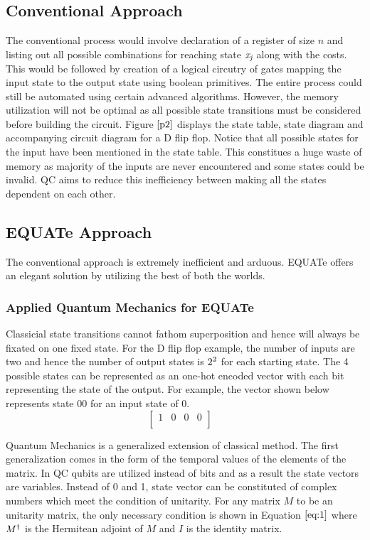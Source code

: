 \documentclass[conference]{IEEEtran}
\begin{document}
\subsection{Conventional Approach}
The conventional process would involve declaration of a register of size $\textit{n}$ and listing out all possible combinations for reaching state $\textit{x\textsubscript{j}}$ along with the costs. This would be followed by creation of a logical circutry of gates mapping the input state to the output state using boolean primitives. The entire process could still be automated using certain advanced algorithms. However, the memory utilization will not be optimal as all possible state transitions must be considered before building the circuit. Figure $\ref{p2}$ displays the state table, state diagram and accompanying circuit diagram for a D flip flop. Notice that all possible states for the input have been mentioned in the state table. This constitues a huge waste of memory as majority of the inputs are never encountered and some states could be invalid. QC aims to reduce this inefficiency between making all the states dependent on each other.

\subsection{EQUATe Approach}

The conventional approach is extremely inefficient and arduous. EQUATe offers an elegant solution by utilizing the best of both the worlds. 

\subsubsection{Applied Quantum Mechanics for EQUATe}
Classicial state transitions cannot fathom superposition and hence will always be fixated on one fixed state. For the D flip flop example, the number of inputs are two and hence the number of output states is $2\textsuperscript{2}$ for each starting state. The 4 possible states can be represented as an one-hot encoded vector with each bit representing the state of the output. For example, the vector shown below represents state 00 for an input state of 0.
$$
\begin{bmatrix} 
1&0&0&0\\
\end{bmatrix}
\quad
$$

Quantum Mechanics is a generalized extension of classical method. The first generalization comes in the form of the temporal values of the elements of the matrix. In QC qubits are utilized instead of bits and as a result the state vectors are variables. Instead of 0 and 1, state vector can be constituted of complex numbers which meet the condition of unitarity. For any matrix $\textit{M}$ to be an unitarity matrix, the only necessary condition is shown in Equation $\ref{eq:1}$ where $M\textsuperscript{$\dagger$}$ is the Hermitean adjoint of $\textit{M}$ and $\textit{I}$ is the identity matrix. 
\end{document}
